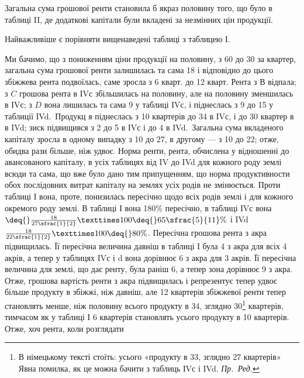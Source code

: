 
Загальна сума грошової ренти становила б якраз половину того, що було
в таблиці II, де додаткові капітали були вкладені за незмінних цін продукції.

Найважливіше є порівняти вищенаведені таблиці з таблицею І.

Ми бачимо, що з пониженням ціни продукції на половину, з 60 до
30 за квартер, загальна сума грошової ренти залишилась та сама \deq{} 18 і відповідно до цього збіжжева рента подвоїлась, саме зросла з 6 кварт. до
12 кварт. Рента з $В$ відпала; з $C$ грошова рента в ІVс збільшилась на половину,
але на половину зменшилась в ІVс; з $D$ вона лишилась та сама \deq{} 9 у таблиці ІVс, і піднеслась з 9 до 15 у таблиції ІVd.~Продукц я піднеслась з 10 квартерів до 34 в ІVс, і до 30 квартер в в IVd;
зиск підвищився з 2 до 5 в ІVс і до 4 в IVd.~Загальна сума
вкладеного капіталу зросла в одному випадку з 10 до 27,
в другому — з 10 до 22; отже, обидва рази більше, ніж удвоє. Норма
ренти, рента, обчислена у відношенні до авансованого капіталу, в усіх таблицях
від IV до IVd для кожного роду землі всюди та сама, що вже було дано тим припущенням,
що норма продуктивности обох послідовних витрат капіталу на землях
усіх родів не змінюється. Проти таблиці І вона, проте, понизилась пересічно
щодо всіх родів землі і для кожного окремого роду землі. В таблиці І вона \deq{}
180\% пересічно, в таблиці ІVс вона$ \deq{} \frac{18}{27\sfrac{1}{2}} × 100 \deq{} 65\sfrac{5}{11}\%$ і
IVd \deq{} $\frac{18}{22\sfrac{1}{2}} × 100 \deq{} 80\%$. Пересічна грошова рента з акра підвищилась. Її пересічна
величина давніш в таблиці І була 4 з акра для всіх 4 акрів,
а тепер у таблицях IVс і d вона дорівнює 6 з акра для 3 акрів.
Її пересічна величина для землі, що дає ренту, була раніш 6, а тепер
зона дорівнює 9 з акра. Отже, грошова вартість ренти з акра підвищилась
і репрезентує тепер удвоє більше продукту в збіжжі, ніж давніш, але
12 квартерів збіжжевої ренти тепер становлять менше, ніж половину всього продукту
в 34, зглядно 30\footnote*{В німецькому тексті стоїть: усього «продукту в 33, зглядно 27 квартерів» Явна помилка,
як це можна бачити з таблиць ІVс і IVd. \emph{Пр.~Ред.}} квартерів, тимчасом як у таблиці І 6 квартерів становлять
  усього продукту в 10 квартерів. Отже, хоч рента, коли розглядати
